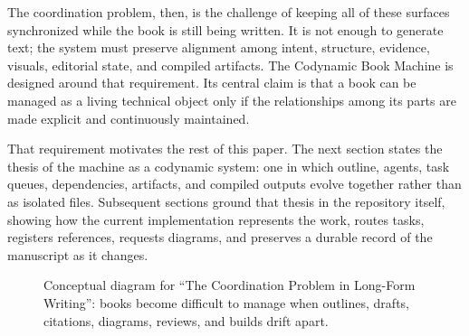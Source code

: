 The coordination problem, then, is the challenge of keeping all of these surfaces synchronized while the book is still being written. It is not enough to generate text; the system must preserve alignment among intent, structure, evidence, visuals, editorial state, and compiled artifacts. The Codynamic Book Machine is designed around that requirement. Its central claim is that a book can be managed as a living technical object only if the relationships among its parts are made explicit and continuously maintained.

That requirement motivates the rest of this paper. The next section states the thesis of the machine as a codynamic system: one in which outline, agents, task queues, dependencies, artifacts, and compiled outputs evolve together rather than as isolated files. Subsequent sections ground that thesis in the repository itself, showing how the current implementation represents the work, routes tasks, registers references, requests diagrams, and preserves a durable record of the manuscript as it changes.

\begin{figure}[htbp]
\centering

\caption{Conceptual diagram for ``The Coordination Problem in Long-Form Writing'': books become difficult to manage when outlines, drafts, citations, diagrams, reviews, and builds drift apart.}
\end{figure}
